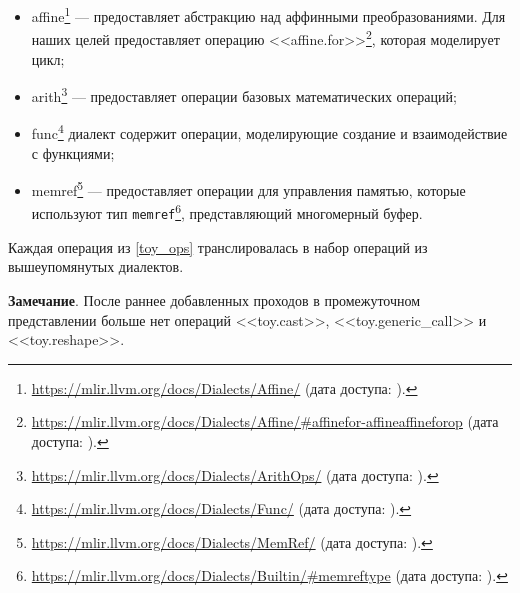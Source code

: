 \begin{itemize}
	\item affine\footnote{\url{https://mlir.llvm.org/docs/Dialects/Affine/} (дата доступа:   ).} --- предоставляет абстракцию над аффинными преобразованиями. Для наших целей предоставляет операцию <<affine.\-for>>\footnote{\url{https://mlir.llvm.org/docs/Dialects/Affine/\#affinefor-affineaffineforop} (дата доступа:   ).}, которая моделирует цикл;
	\item arith\footnote{\url{https://mlir.llvm.org/docs/Dialects/ArithOps/} (дата доступа:   ).} --- предоставляет операции базовых математических операций;
	\item func\footnote{\url{https://mlir.llvm.org/docs/Dialects/Func/} (дата доступа:   ).} диалект содержит операции, моделирующие создание и взаимодействие с функциями;
	\item memref\footnote{\url{https://mlir.llvm.org/docs/Dialects/MemRef/} (дата доступа:   ).} --- предоставляет операции для управления памятью, которые используют тип \texttt{memref}\footnote{\url{https://mlir.llvm.org/docs/Dialects/Builtin/\#memreftype} (дата доступа:   ).}, представляющий многомерный буфер.
\end{itemize}

Каждая операция из \ref{toy_ops} транслировалась в набор операций из вышеупомянутых диалектов.

\textbf{Замечание}.
После раннее добавленных проходов в промежуточном представлении больше нет операций <<toy.cast>>, <<toy.generic\_call>> и <<toy.reshape>>.

